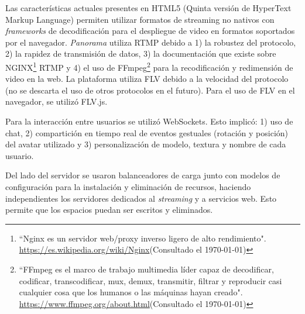 Las características actuales presentes en HTML5 (Quinta versión de HyperText Markup Language) permiten utilizar formatos de streaming no nativos con \textit{frameworks} de decodificación para el despliegue de video en formatos soportados por el navegador. \textit{Panorama} utiliza RTMP debido a 1) la robustez del protocolo, 2) la rapidez de transmisión de datos, 3) la documentación que existe sobre NGINX\footnote{``Nginx es un servidor web/proxy inverso ligero de alto rendimiento". \url{https://es.wikipedia.org/wiki/Nginx}(Consultado el \today)} RTMP y 4) el uso de FFmpeg\footnote{``FFmpeg es el marco de trabajo multimedia líder capaz de decodificar, codificar, transcodificar, mux, demux, transmitir, filtrar y reproducir casi cualquier cosa que los humanos o las máquinas hayan creado". \url{https://www.ffmpeg.org/about.html}(Consultado el \today)} para la recodificación y redimensión de video en la web. La plataforma utiliza FLV debido a la velocidad del protocolo (no se descarta el uso de otros protocolos en el futuro). Para el uso de FLV en el navegador, se utilizó FLV.js. 

Para la interacción entre usuarios se utilizó WebSockets. Esto implicó: 1) uso de chat, 2) compartición en tiempo real de eventos gestuales (rotación y posición) del avatar utilizado y 3) personalización de modelo, textura y nombre de cada usuario. 

Del lado del servidor  se usaron balanceadores de carga junto con modelos de configuración para la instalación y eliminación de recursos, haciendo independientes los servidores dedicados al \textit{streaming} y a servicios web. Esto permite que los espacios puedan ser escritos y eliminados.


